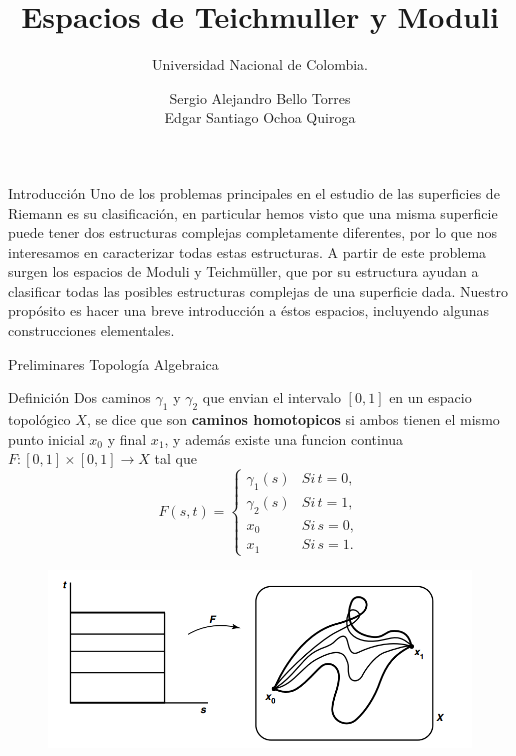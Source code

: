\documentclass[xcolor=dvipsnames,10pt]{beamer}
\title[Universidad Nacional de Colombia]{Espacios de Teichmuller y Moduli}
\subtitle{Universidad  Nacional de Colombia.}
\author[Superficies de Riemann]{Sergio Alejandro Bello Torres\\
Edgar Santiago Ochoa Quiroga}
\date[\textcolor{white}{Julio/2025}]
\begin{document}
\maketitle
\begin{frame}{Introducción}
    Uno de los problemas principales en el estudio de las superficies de Riemann es su clasificación, en particular hemos visto que una misma superficie puede tener dos estructuras complejas completamente diferentes, por lo que nos interesamos en caracterizar todas estas estructuras. A partir de este problema surgen los espacios de Moduli y Teichmüller, que por su estructura ayudan a clasificar todas las posibles estructuras complejas de una superficie dada. Nuestro propósito es hacer una breve introducción a éstos espacios, incluyendo algunas construcciones elementales.

\end{frame}
\begin{frame}{Preliminares Topología Algebraica}

    \begin{block}{Definición}
        Dos caminos $\gamma_1$ y $\gamma_2$ que envian el intervalo $[0,1]$ en un espacio topológico $X$, se dice que son \textbf{caminos homotopicos} si ambos tienen el mismo punto inicial $x_0$ y final $x_1$, y además existe una funcion continua $F:[0,1]\times[0,1]\to X$ tal que
        $$F(s,t)=\begin{cases}
        \gamma_1(s) & Si\,t=0,\\
        \gamma_2(s) & Si\,t=1,\\
        x_0& Si\,s=0,\\
        x_1& Si\,s=1.
        \end{cases}$$
        \end{block}
        \begin{figure}
        \centering
        \includegraphics[width=0.5\linewidth]{Imagenes/imagen_2025-07-10_112455145.png}
    \end{figure}
\end{frame}
\end{document}
